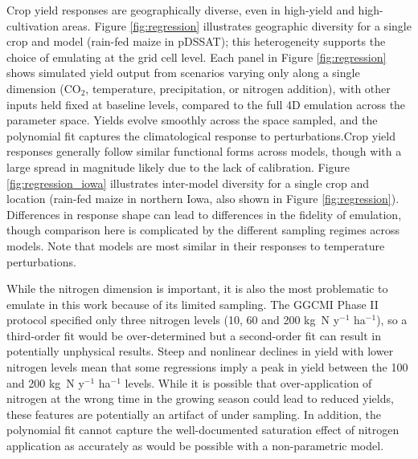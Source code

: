 \documentclass[preprint, 5p, times, twocolumn]{elsarticle}
\begin{document}
Crop yield responses are geographically diverse, even in high-yield and high-cultivation areas. Figure \ref{fig:regression} illustrates geographic diversity for a single crop and model (rain-fed maize in pDSSAT); this heterogeneity supports the choice of emulating at the grid cell level. Each panel in Figure \ref{fig:regression} shows simulated yield output from scenarios varying only along a single dimension (CO$_2$, temperature, precipitation, or nitrogen addition), with other inputs held fixed at baseline levels, compared to the full 4D emulation across the parameter space. Yields evolve smoothly across the space sampled, and the polynomial fit captures the climatological response to perturbations.Crop yield responses generally follow similar functional forms across models, though with a large spread in magnitude likely due to the lack of calibration. Figure \ref{fig:regression_iowa} illustrates inter-model diversity for a single crop and location (rain-fed maize in northern Iowa, also shown in Figure \ref{fig:regression}). Differences in response shape can lead to  differences in the fidelity of emulation, though comparison here is complicated by the different sampling regimes across models. Note that models are most similar in their responses to temperature perturbations. 


While the nitrogen dimension is important, it is also the most problematic to emulate in this work because of its limited sampling. The GGCMI Phase II protocol specified only three nitrogen levels (10, 60 and 200 kg~N y$^{-1}$ ha$^{-1}$), so a third-order fit would be over-determined but a second-order fit can result in potentially unphysical results. Steep and nonlinear declines in yield with lower nitrogen levels mean that some regressions imply a peak in yield between the 100 and 200 kg~N y$^{-1}$ ha$^{-1}$ levels. While it is possible that over-application of nitrogen at the wrong time in the growing season could lead to reduced yields, these features are potentially an artifact of under sampling. In addition, the polynomial fit cannot capture the well-documented saturation effect of nitrogen application \citep[e.g.][]{Torsten77} as accurately as would be possible with a non-parametric model. 
\end{document}
